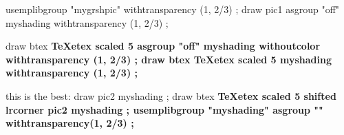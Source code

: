 \leavevmode
\mpfig
usemplibgroup "mygrshpic"
withtransparency (1, 2/3) ;
\endmpfig
\mpfig %
draw pic1
asgroup "off"
myshading
withtransparency (1, 2/3) ;
\endmpfig

\leavevmode
\mpfig %
draw btex \bf\TeX etex scaled 5
asgroup "off"
myshading
withoutcolor
withtransparency (1, 2/3) ;
\endmpfig
\mpfig %
draw btex \bf\TeX etex scaled 5
myshading
withtransparency (1, 2/3) ;
\endmpfig

this is the best:
\mpfig
draw pic2
myshading ;
draw btex \bf\TeX etex scaled 5 shifted lrcorner pic2
myshading ;
\endmpfig
\endmplibgroup
\mpfig
usemplibgroup "myshading" asgroup "" withtransparency(1, 2/3) ;
\endmpfig
\bye

